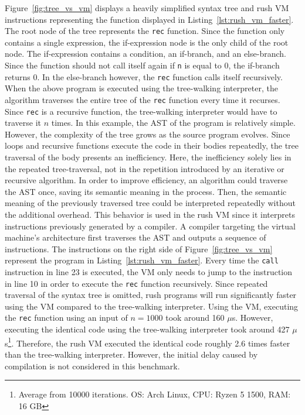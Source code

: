 Figure~\ref{fig:tree_vs_vm} displays a heavily simplified syntax tree and rush VM instructions representing the function displayed in Listing~\ref{lst:rush_vm_faster}.
The root node of the tree represents the \texttt{rec} function.
Since the function only contains a single expression, the if-expression node is the only child of the root node.
The if-expression contains a condition, an if-branch, and an else-branch.
Since the function should not call itself again if \texttt{n} is equal to 0, the if-branch returns 0.
In the else-branch however, the \texttt{rec} function calls itself recursively.
When the above program is executed using the tree-walking interpreter, the algorithm traverses the entire tree of the \texttt{rec} function every time it recurses.
Since \texttt{rec} is a recursive function, the tree-walking interpreter would have to traverse it $n$ times.
In this example, the AST of the program is relatively simple.
However, the complexity of the tree grows as the source program evolves.
Since loops and recursive functions execute the code in their bodies repeatedly, the tree traversal of the body presents an inefficiency.
Here, the inefficiency solely lies in the repeated tree-traversal, not in the repetition introduced by an iterative or recursive algorithm.
In order to improve efficiency, an algorithm could traverse the AST once, saving its semantic meaning in the process.
Then, the semantic meaning of the previously traversed tree could be interpreted repeatedly without the additional overhead.
This behavior is used in the rush VM since it interprets instructions previously generated by a compiler.
A compiler targeting the virtual machine's architecture first traverses the AST and outputs a sequence of instructions.
The instructions on the right side of Figure~\ref{fig:tree_vs_vm} represent the program in Listing~\ref{lst:rush_vm_faster}.
Every time the \texttt{call} instruction in line 23 is executed, the VM only needs to jump to the instruction in line 10 in order to execute the \texttt{rec} function recursively.
Since repeated traversal of the syntax tree is omitted, rush programs will run significantly faster using the VM compared to the tree-walking interpreter.
Using the VM, executing the \texttt{rec} function using an input of $n = 1000$ took around 160 $\mu$s.
However, executing the identical code using the tree-walking interpreter took around 427 $\mu$s\footnote{Average from 10000 iterations. OS: Arch Linux, CPU: Ryzen 5 1500, RAM: 16 GB}.
Therefore, the rush VM executed the identical code roughly 2.6 times faster than the tree-walking interpreter.
However, the initial delay caused by compilation is not considered in this benchmark.

